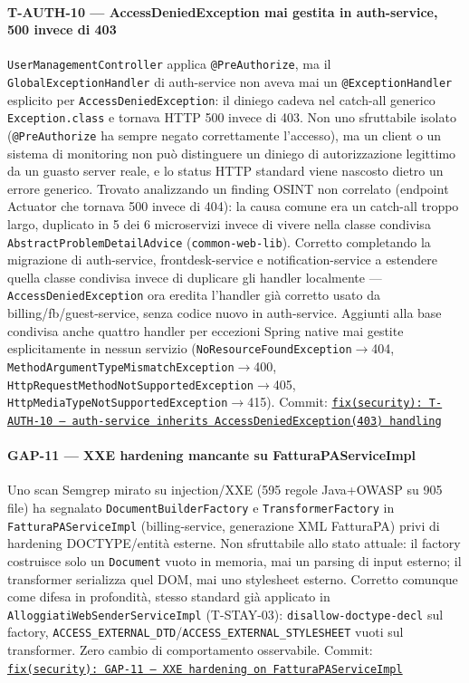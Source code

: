 ﻿\documentclass[a4paper,12pt]{report}
\newcommand{\commitref}[2]{\texttt{\small \href{https://github.com/diegoandruccioli/hotel-pms/commit/#1}{#2}}}
\begin{document}
\paragraph{T-AUTH-10 --- AccessDeniedException mai gestita in auth-service, 500 invece di 403}
\texttt{UserManagementController} applica \texttt{@PreAuthorize}, ma il
\texttt{GlobalExceptionHandler} di auth-service non aveva mai un \texttt{@ExceptionHandler}
esplicito per \texttt{AccessDeniedException}: il diniego cadeva nel catch-all generico
\texttt{Exception.class} e tornava HTTP 500 invece di 403. Non uno sfruttabile isolato
(\texttt{@PreAuthorize} ha sempre negato correttamente l'accesso), ma un client o un
sistema di monitoring non può distinguere un diniego di autorizzazione legittimo da un
guasto server reale, e lo status HTTP standard viene nascosto dietro un errore generico.
Trovato analizzando un finding OSINT non correlato (endpoint Actuator che tornava 500
invece di 404): la causa comune era un catch-all troppo largo, duplicato in 5 dei 6
microservizi invece di vivere nella classe condivisa \texttt{AbstractProblemDetailAdvice}
(\texttt{common-web-lib}). Corretto completando la migrazione di auth-service,
frontdesk-service e notification-service a estendere quella classe condivisa invece di
duplicare gli handler localmente — \texttt{AccessDeniedException} ora eredita l'handler
già corretto usato da billing/fb/guest-service, senza codice nuovo in auth-service.
Aggiunti alla base condivisa anche quattro handler per eccezioni Spring native mai gestite
esplicitamente in nessun servizio (\texttt{NoResourceFoundException}$\to$404,
\texttt{MethodArgumentTypeMismatchException}$\to$400,
\texttt{HttpRequestMethodNotSupportedException}$\to$405,
\texttt{HttpMediaTypeNotSupportedException}$\to$415).
Commit: \commitref{8c0fa2c}{fix(security): T-AUTH-10 --- auth-service inherits AccessDeniedException(403) handling}

\paragraph{GAP-11 --- XXE hardening mancante su FatturaPAServiceImpl}
Uno scan Semgrep mirato su injection/XXE (595 regole Java+OWASP su 905 file) ha
segnalato \texttt{DocumentBuilderFactory} e \texttt{TransformerFactory} in
\texttt{FatturaPAServiceImpl} (billing-service, generazione XML FatturaPA) privi di
hardening DOCTYPE/entità esterne. Non sfruttabile allo stato attuale: il factory
costruisce solo un \texttt{Document} vuoto in memoria, mai un parsing di input esterno;
il transformer serializza quel DOM, mai uno stylesheet esterno. Corretto comunque come
difesa in profondità, stesso standard già applicato in \texttt{AlloggiatiWebSenderServiceImpl}
(T-STAY-03): \texttt{disallow-doctype-decl} sul factory,
\texttt{ACCESS\_EXTERNAL\_DTD}/\texttt{ACCESS\_EXTERNAL\_STYLESHEET} vuoti sul
transformer. Zero cambio di comportamento osservabile.
Commit: \commitref{3fc4b07}{fix(security): GAP-11 --- XXE hardening on FatturaPAServiceImpl}
\end{document}
